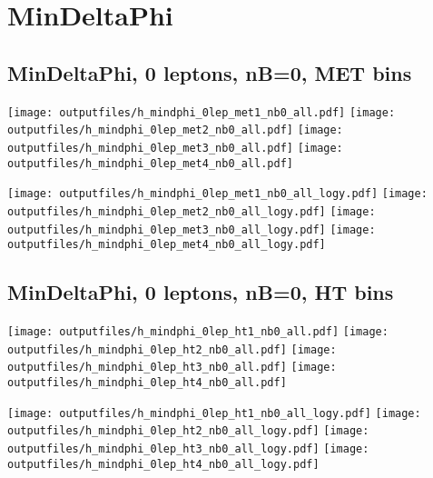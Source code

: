 \documentclass[11pt]{article}
\begin{document}
    \section{ MinDeltaPhi }

    \subsection{ MinDeltaPhi, 0 leptons, nB=0, MET bins }

    \noindent
     \texttt{[image: outputfiles/h\_mindphi\_0lep\_met1\_nb0\_all.pdf]}
     \texttt{[image: outputfiles/h\_mindphi\_0lep\_met2\_nb0\_all.pdf]}
     \texttt{[image: outputfiles/h\_mindphi\_0lep\_met3\_nb0\_all.pdf]}
     \texttt{[image: outputfiles/h\_mindphi\_0lep\_met4\_nb0\_all.pdf]}

    \noindent
     \texttt{[image: outputfiles/h\_mindphi\_0lep\_met1\_nb0\_all\_logy.pdf]}
     \texttt{[image: outputfiles/h\_mindphi\_0lep\_met2\_nb0\_all\_logy.pdf]}
     \texttt{[image: outputfiles/h\_mindphi\_0lep\_met3\_nb0\_all\_logy.pdf]}
     \texttt{[image: outputfiles/h\_mindphi\_0lep\_met4\_nb0\_all\_logy.pdf]}

    \clearpage



    \subsection{ MinDeltaPhi, 0 leptons, nB=0, HT bins }

    \noindent
     \texttt{[image: outputfiles/h\_mindphi\_0lep\_ht1\_nb0\_all.pdf]}
     \texttt{[image: outputfiles/h\_mindphi\_0lep\_ht2\_nb0\_all.pdf]}
     \texttt{[image: outputfiles/h\_mindphi\_0lep\_ht3\_nb0\_all.pdf]}
     \texttt{[image: outputfiles/h\_mindphi\_0lep\_ht4\_nb0\_all.pdf]}

    \noindent
     \texttt{[image: outputfiles/h\_mindphi\_0lep\_ht1\_nb0\_all\_logy.pdf]}
     \texttt{[image: outputfiles/h\_mindphi\_0lep\_ht2\_nb0\_all\_logy.pdf]}
     \texttt{[image: outputfiles/h\_mindphi\_0lep\_ht3\_nb0\_all\_logy.pdf]}
     \texttt{[image: outputfiles/h\_mindphi\_0lep\_ht4\_nb0\_all\_logy.pdf]}
\end{document}
